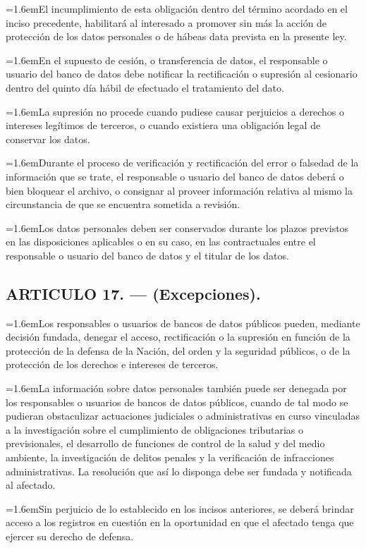 \documentclass[10pt,a4paper]{article}
\newcommand{\articulo}[1]{\subsection{#1}}
\newcommand{\inciso}[2]{\par{\hangindent=1.6em\hangafter=1\makebox[1.6em][l]{#1}#2\par}}
\begin{document}
\inciso{3.}{El incumplimiento de esta obligación dentro del término acordado en el inciso precedente, habilitará al interesado a promover sin más la acción de protección de los datos personales o de hábeas data prevista en la presente ley.}

\inciso{4.}{En el supuesto de cesión, o transferencia de datos, el responsable o usuario del banco de datos debe notificar la rectificación o supresión al cesionario dentro del quinto día hábil de efectuado el tratamiento del dato.}

\inciso{5.}{La supresión no procede cuando pudiese causar perjuicios a derechos o intereses legítimos de terceros, o cuando existiera una obligación legal de conservar los datos.}

\inciso{6.}{Durante el proceso de verificación y rectificación del error o falsedad de la información que se trate, el responsable o usuario del banco de datos deberá o bien bloquear el archivo, o consignar al proveer información relativa al mismo la circunstancia de que se encuentra sometida a revisión.}

\inciso{7.}{Los datos personales deben ser conservados durante los plazos previstos en las disposiciones aplicables o en su caso, en las contractuales entre el responsable o usuario del banco de datos y el titular de los datos.}

\articulo{ARTICULO 17. — (Excepciones).}
\inciso{1.}{Los responsables o usuarios de bancos de datos públicos pueden, mediante decisión fundada, denegar el acceso, rectificación o la supresión en función de la protección de la defensa de la Nación, del orden y la seguridad públicos, o de la protección de los derechos e intereses de terceros.}

\inciso{2.}{La información sobre datos personales también puede ser denegada por los responsables o usuarios de bancos de datos públicos, cuando de tal modo se pudieran obstaculizar actuaciones judiciales o administrativas en curso vinculadas a la investigación sobre el cumplimiento de obligaciones tributarias o previsionales, el desarrollo de funciones de control de la salud y del medio ambiente, la investigación de delitos penales y la verificación de infracciones administrativas. La resolución que así lo disponga debe ser fundada y notificada al afectado.}

\inciso{3.}{Sin perjuicio de lo establecido en los incisos anteriores, se deberá brindar acceso a los registros en cuestión en la oportunidad en que el afectado tenga que ejercer su derecho de defensa.}
\end{document}
